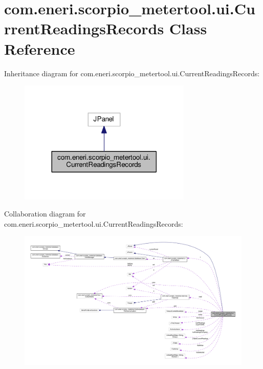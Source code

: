 \hypertarget{classcom_1_1eneri_1_1scorpio__metertool_1_1ui_1_1_current_readings_records}{}\section{com.\+eneri.\+scorpio\+\_\+metertool.\+ui.\+Current\+Readings\+Records Class Reference}
\label{classcom_1_1eneri_1_1scorpio__metertool_1_1ui_1_1_current_readings_records}


Inheritance diagram for com.\+eneri.\+scorpio\+\_\+metertool.\+ui.\+Current\+Readings\+Records\+:
\nopagebreak
\begin{figure}[H]
\begin{center}
\leavevmode
\includegraphics[width=233pt]{classcom_1_1eneri_1_1scorpio__metertool_1_1ui_1_1_current_readings_records__inherit__graph}
\end{center}
\end{figure}


Collaboration diagram for com.\+eneri.\+scorpio\+\_\+metertool.\+ui.\+Current\+Readings\+Records\+:
\nopagebreak
\begin{figure}[H]
\begin{center}
\leavevmode
\includegraphics[width=350pt]{classcom_1_1eneri_1_1scorpio__metertool_1_1ui_1_1_current_readings_records__coll__graph}
\end{center}
\end{figure}
